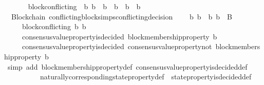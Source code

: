 \begin{isabellebody}
\ \ \isanewline
\ \ \ \ {\isachardoublequoteopen}block{\isacharunderscore}conflicting\ {\isacharequal}\ {\isacharparenleft}{\isasymlambda}{\isacharparenleft}b{}{\isacharcomma}\ b{}{\isacharparenright}{\isachardot}\ {\isasymnot}\ {\isacharparenleft}b{}\ {\isasymdownharpoonright}\ b{}\ {\isasymor}\ b{}\ {\isasymdownharpoonright}\ b{}{\isacharparenright}{\isacharparenright}{\isachardoublequoteclose}\isanewline
\isanewline
{}\isamarkupfalse%
\ {\isacharparenleft}\ Blockchain{\isacharparenright}\ conflicting{\isacharunderscore}blocks{\isacharunderscore}imps{\isacharunderscore}conflicting{\isacharunderscore}decision\ {\isacharcolon}\isanewline
\ \ {\isachardoublequoteopen}{\isasymforall}\ b{}\ b{}\ {\isasymsigma}{\isachardot}\ {\isacharbraceleft}b{}{\isacharcomma}\ b{}{\isacharbraceright}\ {\isasymsubseteq}\ B\ {\isasymand}\ {\isasymsigma}\ {\isasymin}\ {\isasymSigma}\ \isanewline
\ \ \ \ {\isasymlongrightarrow}\ block{\isacharunderscore}conflicting\ {\isacharparenleft}b{}{\isacharcomma}\ b{}{\isacharparenright}\ \isanewline
\ \ \ \ {\isasymlongrightarrow}\ consensus{\isacharunderscore}value{\isacharunderscore}property{\isacharunderscore}is{\isacharunderscore}decided\ {\isacharparenleft}block{\isacharunderscore}membership{\isacharunderscore}property\ b{}{\isacharcomma}\ {\isasymsigma}{\isacharparenright}\ \isanewline
\ \ \ \ {\isasymlongrightarrow}\ consensus{\isacharunderscore}value{\isacharunderscore}property{\isacharunderscore}is{\isacharunderscore}decided\ {\isacharparenleft}consensus{\isacharunderscore}value{\isacharunderscore}property{\isacharunderscore}not\ {\isacharparenleft}block{\isacharunderscore}membership{\isacharunderscore}property\ b{}{\isacharparenright}{\isacharcomma}\ {\isasymsigma}{\isacharparenright}{\isachardoublequoteclose}\isanewline
%
\isadelimproof
\ \ %
\endisadelimproof
%
\isatagproof
{}\isamarkupfalse%
\ {\isacharparenleft}simp\ add{\isacharcolon}\ block{\isacharunderscore}membership{\isacharunderscore}property{\isacharunderscore}def\ consensus{\isacharunderscore}value{\isacharunderscore}property{\isacharunderscore}is{\isacharunderscore}decided{\isacharunderscore}def\isanewline
\ \ \ \ \ \ \ \ \ \ naturally{\isacharunderscore}corresponding{\isacharunderscore}state{\isacharunderscore}property{\isacharunderscore}def\ \ state{\isacharunderscore}property{\isacharunderscore}is{\isacharunderscore}decided{\isacharunderscore}def{\isacharparenright}\isanewline

\end{isabellebody}
